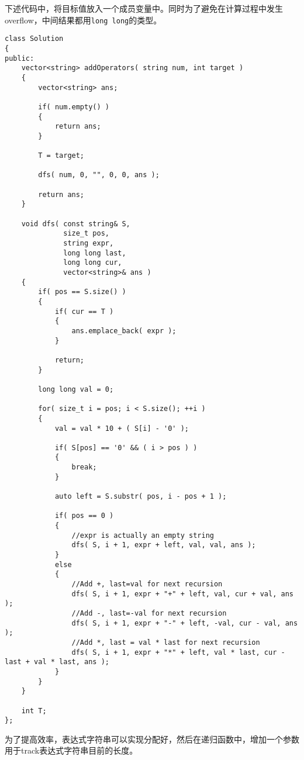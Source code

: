 下述代码中，将目标值放入一个成员变量中。同时为了避免在计算过程中发生overflow，中间结果都用\texttt{long long}的类型。
\setcounter{lstlisting}{0}
\begin{lstlisting}[style=customc, caption={Backtracking}]
class Solution
{
public:
    vector<string> addOperators( string num, int target )
    {
        vector<string> ans;

        if( num.empty() )
        {
            return ans;
        }

        T = target;

        dfs( num, 0, "", 0, 0, ans );

        return ans;
    }

    void dfs( const string& S,
              size_t pos,
              string expr,
              long long last,
              long long cur,
              vector<string>& ans )
    {
        if( pos == S.size() )
        {
            if( cur == T )
            {
                ans.emplace_back( expr );
            }

            return;
        }

        long long val = 0;

        for( size_t i = pos; i < S.size(); ++i )
        {
            val = val * 10 + ( S[i] - '0' );

            if( S[pos] == '0' && ( i > pos ) )
            {
                break;
            }

            auto left = S.substr( pos, i - pos + 1 );

            if( pos == 0 )
            {
                //expr is actually an empty string
                dfs( S, i + 1, expr + left, val, val, ans );
            }
            else
            {
                //Add +, last=val for next recursion
                dfs( S, i + 1, expr + "+" + left, val, cur + val, ans );
                //Add -, last=-val for next recursion
                dfs( S, i + 1, expr + "-" + left, -val, cur - val, ans );
                //Add *, last = val * last for next recursion
                dfs( S, i + 1, expr + "*" + left, val * last, cur - last + val * last, ans );
            }
        }
    }

    int T;
};
\end{lstlisting}
为了提高效率，表达式字符串可以实现分配好，然后在递归函数中，增加一个参数用于track表达式字符串目前的长度。
